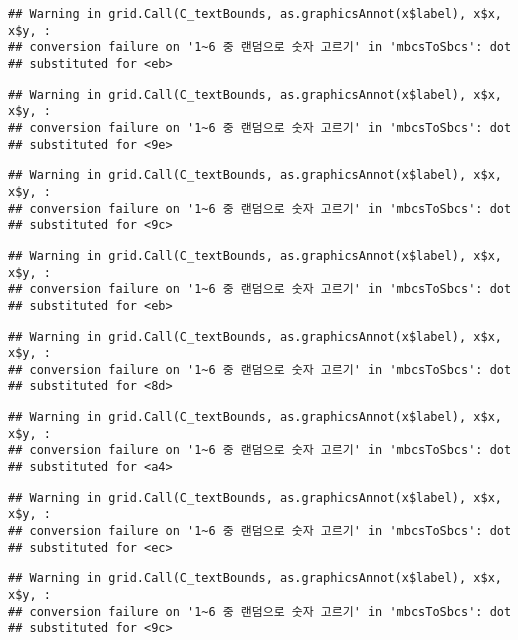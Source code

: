 \documentclass[]{book}
\begin{document}
\begin{verbatim}
## Warning in grid.Call(C_textBounds, as.graphicsAnnot(x$label), x$x, x$y, :
## conversion failure on '1~6 중 랜덤으로 숫자 고르기' in 'mbcsToSbcs': dot
## substituted for <eb>
\end{verbatim}

\begin{verbatim}
## Warning in grid.Call(C_textBounds, as.graphicsAnnot(x$label), x$x, x$y, :
## conversion failure on '1~6 중 랜덤으로 숫자 고르기' in 'mbcsToSbcs': dot
## substituted for <9e>
\end{verbatim}

\begin{verbatim}
## Warning in grid.Call(C_textBounds, as.graphicsAnnot(x$label), x$x, x$y, :
## conversion failure on '1~6 중 랜덤으로 숫자 고르기' in 'mbcsToSbcs': dot
## substituted for <9c>
\end{verbatim}

\begin{verbatim}
## Warning in grid.Call(C_textBounds, as.graphicsAnnot(x$label), x$x, x$y, :
## conversion failure on '1~6 중 랜덤으로 숫자 고르기' in 'mbcsToSbcs': dot
## substituted for <eb>
\end{verbatim}

\begin{verbatim}
## Warning in grid.Call(C_textBounds, as.graphicsAnnot(x$label), x$x, x$y, :
## conversion failure on '1~6 중 랜덤으로 숫자 고르기' in 'mbcsToSbcs': dot
## substituted for <8d>
\end{verbatim}

\begin{verbatim}
## Warning in grid.Call(C_textBounds, as.graphicsAnnot(x$label), x$x, x$y, :
## conversion failure on '1~6 중 랜덤으로 숫자 고르기' in 'mbcsToSbcs': dot
## substituted for <a4>
\end{verbatim}

\begin{verbatim}
## Warning in grid.Call(C_textBounds, as.graphicsAnnot(x$label), x$x, x$y, :
## conversion failure on '1~6 중 랜덤으로 숫자 고르기' in 'mbcsToSbcs': dot
## substituted for <ec>
\end{verbatim}

\begin{verbatim}
## Warning in grid.Call(C_textBounds, as.graphicsAnnot(x$label), x$x, x$y, :
## conversion failure on '1~6 중 랜덤으로 숫자 고르기' in 'mbcsToSbcs': dot
## substituted for <9c>
\end{verbatim}
\end{document}
